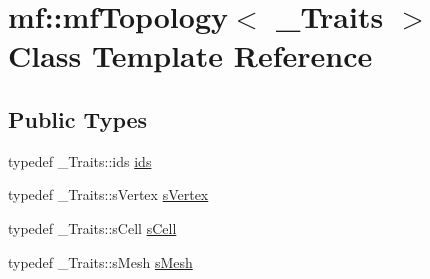 \hypertarget{classmf_1_1mfTopology}{
\section{mf::mfTopology$<$ \_\-Traits $>$ Class Template Reference}
\label{classmf_1_1mfTopology}
}
\subsection*{Public Types}
\begin{DoxyCompactItemize}
\item 
typedef \_\-Traits::ids \hyperlink{classmf_1_1mfTopology_ab491100e8580485911e86e63fe3cdaed}{ids}
\item 
typedef \_\-Traits::sVertex \hyperlink{classmf_1_1mfTopology_a8f282660d77836ffaa0a373f8652f371}{sVertex}
\item 
typedef \_\-Traits::sCell \hyperlink{classmf_1_1mfTopology_afc62aa92ab9d99d296d9c5ae5d7a4919}{sCell}
\item 
typedef \_\-Traits::sMesh \hyperlink{classmf_1_1mfTopology_adea65e34b93c17858d4dadc6eb360711}{sMesh}
\end{DoxyCompactItemize}
